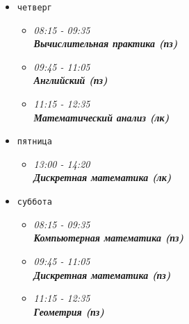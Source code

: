\documentclass[a4paper,11pt]{article} %
\begin{document}
\begin{itemize}
{\begin{itemize}
{					\bf Математический анализ (пз)}
			\end{itemize}	
		}
		\item {
			\texttt{четверг}
			\begin{itemize}
				\item[\checkmark]{\it 08:15 - 09:35 \\
					\bf Вычислительная практика (пз)}
				\item[\checkmark]{\it 09:45 - 11:05 \\
					\bf Английский (пз)}
				\item[\checkmark]{\it 11:15 - 12:35 \\
					\bf Математический анализ (лк)}
			\end{itemize}	
		}
		\item {
			\texttt{пятница}
			\begin{itemize}
				\item[\checkmark]{\it 13:00 - 14:20 \\
					\bf Дискретная математика (лк)} 
			\end{itemize}	
		}
		\item {
			\texttt{суббота}
			\begin{itemize}
				\item[\checkmark]{\it 08:15 - 09:35 \\
					\bf Компьютерная математика (пз)}
				\item[\checkmark]{\it 09:45 - 11:05 \\
					\bf Дискретная математика (пз)}
				\item[\checkmark]{\it 11:15 - 12:35 \\
					\bf Геометрия (пз)}
			\end{itemize}	
		}
	\end{itemize}
	
\end{document}
